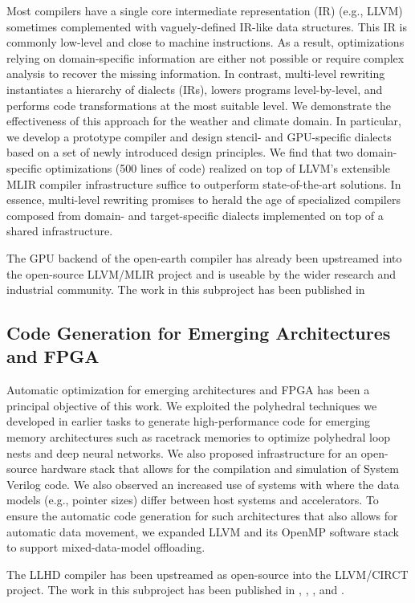 \documentclass[11pt, manuscript,\review anonymous]{acmart}
\begin{document}
Most compilers have a single core intermediate representation (IR) (e.g., LLVM)
sometimes complemented with vaguely-defined IR-like data structures. This IR is
commonly low-level and close to machine instructions. As a result,
optimizations relying on domain-specific information are either not possible or
require complex analysis to recover the missing information. In contrast,
multi-level rewriting instantiates a hierarchy of dialects (IRs), lowers
programs level-by-level, and performs code transformations at the most suitable
level. We demonstrate the effectiveness of this approach for the weather and
climate domain. In particular, we develop a prototype compiler and design
stencil- and GPU-specific dialects based on a set of newly introduced design
principles. We find that two domain-specific optimizations (500 lines of code)
realized on top of LLVM’s extensible MLIR compiler infrastructure suffice to
outperform state-of-the-art solutions. In essence, multi-level rewriting
promises to herald the age of specialized compilers composed from domain- and
target-specific dialects implemented on top of a shared infrastructure.

The GPU backend of the open-earth compiler has already been upstreamed into
the open-source LLVM/MLIR project and is useable by the wider research
and industrial community. The work in this subproject has been published in \citet{gysi2020ooc}


\subsection{Code Generation for Emerging Architectures and FPGA}

Automatic optimization for emerging architectures and FPGA has been a principal
objective of this work. We exploited the polyhedral techniques we developed in
earlier tasks to generate high-performance code for emerging memory
architectures such as racetrack memories to optimize polyhedral loop nests and
deep neural networks. We also proposed infrastructure for an open-source
hardware stack that allows for the compilation and simulation of System Verilog
code. We also observed an increased use of systems with where the data models
(e.g., pointer sizes) differ between host systems and accelerators. To ensure
the automatic code generation for such architectures that also allows for
automatic data movement, we expanded LLVM and its OpenMP software stack to
support mixed-data-model offloading.

The LLHD compiler has been upstreamed as open-source into the LLVM/CIRCT
project. The work in this subproject has been published in \citet{khan2020polyhedral},
\citet{schueki2020llhd}, \citet{kurth2020mixed}, and \citet{kourtis2020compiling}.
\end{document}
